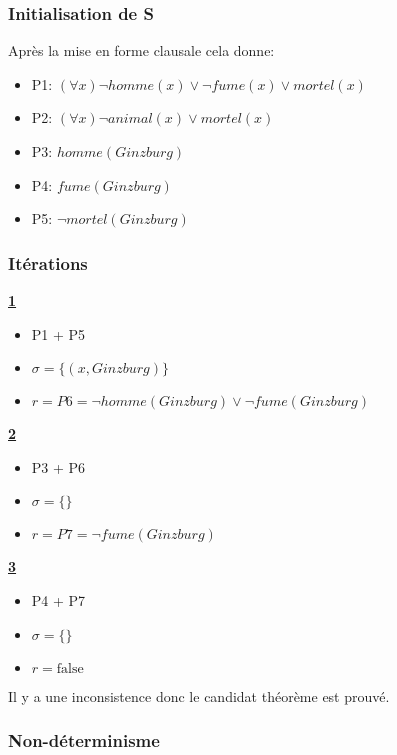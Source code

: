 {\subsubsection{Initialisation de S}
Après la mise en forme clausale cela donne:
\begin{itemize}
  \item P1: $(\forall x) \neg \mathit{homme}(x) \vee \neg \mathit{fume}(x) \vee \mathit{mortel}(x)$
  \item P2: $(\forall x) \neg \mathit{animal}(x) \vee \mathit{mortel}(x)$
  \item P3: $\mathit{homme}(\mathit{Ginzburg})$
  \item P4: $\mathit{fume}(\mathit{Ginzburg})$
  \item P5: $\neg \mathit{mortel}(\mathit{Ginzburg})$
\end{itemize}

\subsubsection{Itérations}

\textbf{\underline{1}}
\begin{itemize}
  \item P1 + P5
  \item $\sigma = \big\{ (x, \mathit{Ginzburg}) \big\}$
  \item $r = P6 = \neg \mathit{homme}(\mathit{Ginzburg}) \vee \neg \mathit{fume}(\mathit{Ginzburg})$
\end{itemize}

\textbf{\underline{2}}
\begin{itemize}
  \item P3 + P6
  \item $\sigma = \big\{ \big\}$
  \item $r = P7 = \neg \mathit{fume}(\mathit{Ginzburg})$
\end{itemize}

\textbf{\underline{3}}
\begin{itemize}
  \item P4 + P7
  \item $\sigma = \big\{ \big\}$
  \item $r = \mathrm{false}$ 
\end{itemize}
Il y a une inconsistence donc le candidat théorème est prouvé.

\subsubsection{Non-déterminisme}

}
